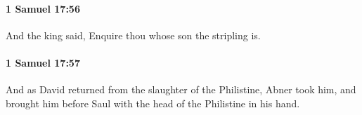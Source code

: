 		\paragraph{1 Samuel 17:56} %
			\label{1SAMUEL-17-56}

			And the king said, Enquire thou whose son the stripling is.


		\paragraph{1 Samuel 17:57} %
			\label{1SAMUEL-17-57}

			And as David returned from the slaughter of the Philistine, Abner took him, and brought him before Saul with the head of the Philistine in his hand.


